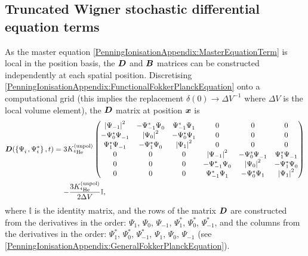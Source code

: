 \subsection{Truncated Wigner stochastic differential equation terms}

As the master equation \eqref{PenningIonisationAppendix:MasterEquationTerm} is local in the position basis, the $\bm{D}$ and $\bm{B}$ matrices can be constructed independently at each spatial position. Discretising \eqref{PenningIonisationAppendix:FunctionalFokkerPlanckEquation} onto a computational grid (this implies the replacement $\delta(0) \rightarrow \Delta V^{-1}$ where $\Delta V$ is the local volume element), the $\bm{D}$ matrix at position $\bm{x}$ is
\begin{align}
    \begin{split}
        \vect{D}(\left\{ \Psi_i^{\phantom{*}}, \Psi_i^* \right\}, t) &= 3 \Kunpol
        \begin{pmatrix}
            \abs{\Psi_{-1}}^2 & - \Psi_{-1}^* \Psi_0^{\phantom{*}} & \Psi_{-1}^* \Psi_{1}^{\phantom{*}} & 0 & 0 & 0 \\
            - \Psi_{0}^* \Psi_{-1}^{\phantom{*}} & \abs{\Psi_{0}}^2 & - \Psi_{0}^*\Psi_1^{\phantom{*}} & 0 & 0 & 0 \\
            \Psi_{1}^* \Psi_{-1}^{\phantom{*}} & - \Psi_{1}^* \Psi_0^{\phantom{*}} & \abs{\Psi_{1}}^2  & 0 & 0 & 0 \\
            0 & 0 & 0 & \abs{\Psi_{-1}}^2 & - \Psi_{0}^* \Psi_{-1}^{\phantom{*}} & \Psi_{1}^* \Psi_{-1}^{\phantom{*}} \\
            0 & 0 & 0 & - \Psi_{-1}^* \Psi_0^{\phantom{*}} & \abs{\Psi_{0}}^2 & - \Psi_{1}^* \Psi_0^{\phantom{*}} \\
            0 & 0 & 0 & \Psi_{-1}^* \Psi_{1}^{\phantom{*}} & - \Psi_0^* \Psi_1 & \abs{\Psi_1}^2
        \end{pmatrix}\\
        &\relphantom{=}- \frac{3 \Kunpol}{2 \Delta V} \mathbb{I},
    \end{split}
    \label{PenningIonisationAppendix:DMatrix}
\end{align}
where $\mathbb{I}$ is the identity matrix, and the rows of the matrix $\bm{D}$ are constructed from the derivatives in the order: $\Psi_1^{\phantom{*}}$, $\Psi_0^{\phantom{*}}$, $\Psi_{-1}^{\phantom{*}}$, $\Psi_1^*$, $\Psi_0^*$, $\Psi_{-1}^*$, and the columns from the derivatives in the order: $\Psi_1^*$, $\Psi_0^*$, $\Psi_{-1}^*$, $\Psi_1^{\phantom{*}}$, $\Psi_0^{\phantom{*}}$, $\Psi_{-1}^{\phantom{*}}$ (see \eqref{PenningIonisationAppendix:GeneralFokkerPlanckEquation}).

